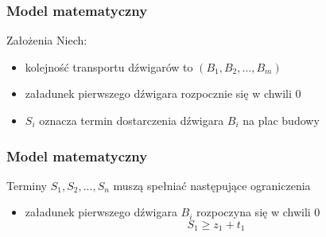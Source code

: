 \documentclass{beamer}
\begin{document}
 \begin{frame}
 \frametitle{Model matematyczny}
 
 \begin{block}{Założenia}
 Niech:
 \begin{itemize}
  \item kolejność transportu dźwigarów to $(B_1, B_2,...,B_m) $
  \item załadunek pierwszego dźwigara rozpocznie się w chwili 0
  \item $ S_i $ oznacza termin dostarczenia dźwigara $B_i$ na plac budowy 
 \end{itemize}
 \end{block}
\end{frame}

 \begin{frame}
 \frametitle{Model matematyczny}
 
 \begin{block}{Terminy $S_1, S_2,...,S_n $ muszą spełniać następujące ograniczenia}
 \begin{itemize}
    \item załadunek pierwszego dźwigara $B_i$ rozpoczyna się w chwili 0
    \begin{equation}\label{eq:ZeroStart}
     S_1 \ge z_1 + t_1 
    \end{equation}
 \end{itemize}
 \end{block}
\end{frame}
\end{document}

